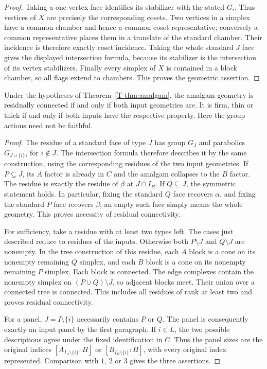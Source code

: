 \begin{proof}
Taking a one-vertex face identifies its stabilizer with the stated $G_i$.
Thus vertices of $X$ are precisely the corresponding cosets. Two vertices
in a simplex have a common chamber and hence a common coset representative;
conversely a common representative places them in a translate of the
standard chamber. Their incidence is therefore exactly coset incidence.
Taking the whole standard $J$ face gives the displayed intersection
formula, because its stabilizer is the intersection of its vertex
stabilizers. Finally every simplex of $X$ is contained in a block chamber,
so all flags extend to chambers. This proves the geometric assertion.
\end{proof}

\begin{corollary}\label{T-cor:residues}
Under the hypotheses of Theorem~\ref{T-thm:amalgam}, the amalgam geometry
is residually connected if and only if both input geometries are.
It is firm, thin or thick if and only if both inputs have the respective
property. Here the group actions need not be faithful.
\end{corollary}
\begin{proof}
The residue of a standard face of type $J$ has group $G_J$ and
parabolics $G_{J\cup\{i\}}$, for $i\notin J$. The intersection formula
therefore describes it by the same construction, using the corresponding
residues of the two input geometries. If $P\subseteq J$, its $A$ factor
is already in $C$ and the amalgam collapses to the $B$ factor. The
residue is exactly the residue of $\beta$ at $J\cap I_B$. If
$Q\subseteq J$, the symmetric statement holds. In particular, fixing
the standard $Q$ face recovers $\alpha$, and fixing the standard $P$
face recovers $\beta$; an empty such face simply means the whole geometry.
This proves necessity of residual connectivity.

For sufficiency, take a residue with at least two types left. The cases
just described reduce to residues of the inputs. Otherwise both
$P\setminus J$ and $Q\setminus J$ are nonempty. In the tree construction
of this residue, each $A$ block is a cone on its nonempty remaining
$Q$ simplex, and each $B$ block is a cone on its nonempty remaining
$P$ simplex. Each block is connected. The edge complexes contain the
nonempty simplex on $(P\cup Q)\setminus J$, so adjacent blocks meet.
Their union over a connected tree is connected. This includes all
residues of rank at least two and proves residual connectivity.

For a panel, $J=I\setminus\{i\}$ necessarily contains $P$ or $Q$.
The panel is consequently exactly an input panel by the first paragraph.
If $i\in L$, the two possible descriptions agree under the fixed
identification in $C$. Thus the panel sizes are the original indices
$[A_{I_A\setminus\{i\}}:H]$ or
$[B_{I_B\setminus\{i\}}:H]$, with every original index represented.
Comparison with $1$, $2$ or $3$ gives the three assertions.
\end{proof}


